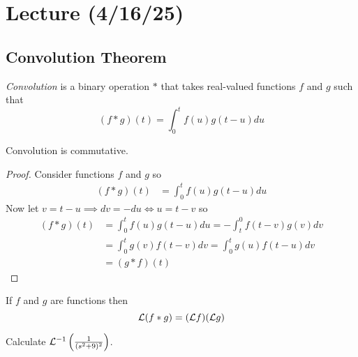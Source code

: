 \documentclass[notes]{subfiles}
\begin{document}
\setcounter{section}{19}
\section{Lecture (4/16/25)}

\subsection{Convolution Theorem}
\begin{definition}
    \textsl{Convolution} is a binary operation $\ast$ that takes real-valued functions $f$ and $g$ such that
    \[
        (f\ast g)(t) = \int_0^t f(u)g(t - u)du
    \]
\end{definition}

\begin{lemma}
    Convolution is commutative.
\end{lemma}
\begin{proof}
    Consider functions $f$ and $g$ so
    \begin{align*}
        (f\ast g)(t)
        &= \int_0^t f(u)g(t - u)du
    \end{align*}
    Now let $v = t - u \implies dv = -du \iff u = t - v$ so
    \begin{align*}
        (f\ast g)(t)
        &= \int_0^t f(u)g(t - u)du
        = -\int_t^0 f(t - v)g(v)dv \\
        &= \int_0^t g(v)f(t - v)dv
        = \int_0^t g(u)f(t - u)dv \\
        &= (g \ast f)(t)
    \end{align*}
\end{proof}

\begin{theorem}
    If $f$ and $g$ are functions then
    \[
        \mathcal{L}(f \ast g) = (\mathcal{L} f)(\mathcal{L} g)
    \]
\end{theorem}

\begin{exercise}
    Calculate $\mathcal{L}^{-1}\left( \frac{1}{(s^2 + 9)^2} \right)$.
\end{exercise}
\begin{solution}
    
\end{solution}
\end{document}
